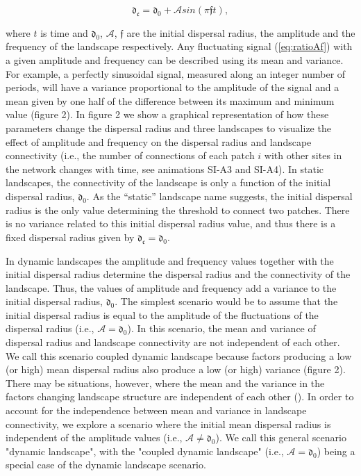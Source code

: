 \documentclass[12pt]{article}
\begin{document}
    \begin{equation}
    \mathfrak{d_{c}} = \mathfrak{d_{0}} + \mathcal{A} sin (\pi \mathfrak{f} t),
    \label{eq:ratioAf}
    \end{equation}
    
    where $t$ is time and $\mathfrak{d_{0}}$, $\mathcal{A}$, $\mathfrak{f}$ are the initial dispersal radius, the amplitude and the frequency of the landscape respectively. Any fluctuating signal (\ref{eq:ratioAf}) with a given amplitude and frequency can be described using its mean and variance. For example, a perfectly sinusoidal signal, measured along an integer number of periods, will have a variance proportional to the amplitude of the signal and a mean given by one half of the difference between its maximum and minimum value (figure 2). In figure 2 we show a graphical representation of how these parameters change the dispersal radius and three landscapes to visualize the effect of amplitude and frequency on the dispersal radius and landscape connectivity (i.e., the number of connections of each patch $i$ with other sites in the network changes with time, see animations SI-A3 and SI-A4). In static landscapes, the connectivity of the landscape is only a function of the initial dispersal radius, $\mathfrak{d_{0}}$. As the ``static'' landscape name suggests, the initial dispersal radius is the only value determining the threshold to connect two patches. There is no variance related to this initial dispersal radius value, and thus there is a fixed dispersal radius given by $\mathfrak{d_{c}} = \mathfrak{d_{0}}$.
    
    In dynamic landscapes the amplitude and frequency values together with the initial dispersal  radius determine the dispersal radius and the connectivity of the landscape. Thus, the values of amplitude and frequency add a variance to the initial dispersal radius, $\mathfrak{d_{0}}$. The simplest scenario would be to assume that the initial dispersal radius is equal to the amplitude of the fluctuations of the dispersal radius (i.e., $\mathcal{A} = \mathfrak{d_{0}}$). In this scenario, the mean and variance of dispersal radius and landscape connectivity are not independent of each other. We call this scenario coupled dynamic landscape because factors producing a low (or high) mean dispersal radius also produce a low (or high) variance (figure 2). There may be situations, however, where the mean and the variance in the factors changing landscape structure are independent of each other (\cite{Violletal2012}). In order to account for the independence between mean and variance in landscape connectivity, we explore a scenario where the initial mean dispersal radius is independent of the amplitude values (i.e., $\mathcal{A} \neq \mathfrak{d_{0}}$). We call this general scenario "dynamic landscape", with the "coupled dynamic landscape" (i.e., $\mathcal{A} = \mathfrak{d_{0}}$) being a special case of the dynamic landscape scenario.
    
\end{document}
